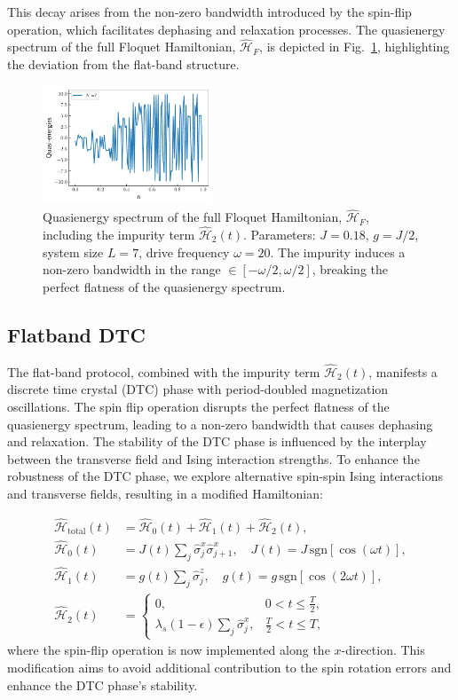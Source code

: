 \documentclass[a4paper, 10pt]{article}
\begin{document}
This decay arises from the non-zero bandwidth introduced by the spin-flip operation, which facilitates dephasing and relaxation processes. The quasienergy spectrum of the full Floquet Hamiltonian, $\hat{\mathcal{H}}_F$, is depicted in Fig.~\ref{figs:impure_flatband_qe}, highlighting the deviation from the flat-band structure.
\begin{figure}[h!]
    \centering
    \includegraphics[width=0.45\textwidth]{figs/impure_flatband_qe.pdf}
    \caption{Quasienergy spectrum of the full Floquet Hamiltonian, $\hat{\mathcal{H}}_F$, including the impurity term $\hat{\mathcal{H}}_2(t)$. Parameters: $J=0.18$, $g=J/2$, system size $L=7$, drive frequency $\omega=20$. The impurity induces a non-zero bandwidth in the range $\in[-\omega/2 , \omega/2]$, breaking the perfect flatness of the quasienergy spectrum.}
    \label{figs:impure_flatband_qe}
\end{figure}

\subsection{Flatband DTC}
The flat-band protocol, combined with the impurity term $\hat{\mathcal{H}}_2(t)$, manifests a discrete time crystal (DTC) phase with period-doubled magnetization oscillations. The spin flip operation disrupts the perfect flatness of the quasienergy spectrum, leading to a non-zero bandwidth that causes dephasing and relaxation. The stability of the DTC phase is influenced by the interplay between the transverse field and Ising interaction strengths. To enhance the robustness of the DTC phase, we explore alternative spin-spin Ising interactions and transverse fields, resulting in a modified Hamiltonian:


\begin{align}
    \hat{\mathcal{H}}_{\text{total}}(t) &=  \hat{\mathcal{H}}_0(t) + \hat{\mathcal{H}}_1(t)  + \hat{\mathcal{H}}_2(t), \\
    \hat{\mathcal{H}}_0(t) &= J(t)\sum_{j} \hat{\sigma}_j^x \hat{\sigma}_{j+1}^x, \quad J(t) = J\, \mathrm{sgn}[\cos(\omega t)], \\
    \hat{\mathcal{H}}_1(t) &= g(t)\sum_{j}\hat{\sigma}_j^z, \quad g(t) = g\, \mathrm{sgn}[\cos(2 \omega t)], \\
    \hat{\mathcal{H}}_2(t) &=
    \begin{cases}
        0, & 0 < t \leq \frac{T}{2}, \\
        \lambda_s (1- \epsilon)\sum_{j}\hat{\sigma}_j^x, & \frac{T}{2} < t \leq T,
    \end{cases}
\end{align}
where the spin-flip operation is now implemented along the $x$-direction. This modification aims to avoid additional contribution to the spin rotation errors and enhance the DTC phase's stability. 
\end{document}
